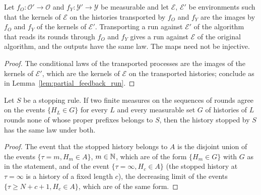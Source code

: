 \begin{lemma}
  \label{lem:relabel_run}
  \leanok
  Let $f_O : \mathcal{O}' \to \mathcal{O}$ and $f_Y : \mathcal{Y}' \to \mathcal{Y}$ be measurable and
  let $\mathcal{E}$, $\mathcal{E}'$ be environments such that the kernels of $\mathcal{E}$ on the
  histories transported by $f_O$ and $f_Y$ are the images by $f_O$ and $f_Y$ of the kernels of
  $\mathcal{E}'$. Transporting a run against $\mathcal{E}'$ of the algorithm that reads its rounds
  through $f_O$ and $f_Y$ gives a run against $\mathcal{E}$ of the original algorithm, and the
  outputs have the same law. The maps need not be injective.
\end{lemma}

\begin{proof}
  \leanok
  The conditional laws of the transported processes are the images of the kernels of
  $\mathcal{E}'$, which are the kernels of $\mathcal{E}$ on the transported histories; conclude as
  in Lemma~\ref{lem:partial_feedback_run}.
\end{proof}

\begin{lemma}
  \label{lem:stopped_law_pre_stop}
  \leanok
  Let $S$ be a stopping rule. If two finite measures on the sequences of rounds agree on the events
  $\{H_L \in G\}$ for every $L$ and every measurable set $G$ of histories of $L$ rounds none of whose
  proper prefixes belongs to $S$, then the history stopped by $S$ has the same law under both.
\end{lemma}

\begin{proof}
  \leanok
  The event that the stopped history belongs to $A$ is the disjoint union of the events
  $\{\tau = m, H_m \in A\}$, $m \in \mathbb{N}$, which are of the form $\{H_m \in G\}$ with $G$ as in the
  statement, and of the event $\{\tau = \infty, H_c \in A\}$ (the stopped history at $\tau = \infty$
  is a history of a fixed length $c$), the decreasing limit of the events
  $\{\tau \ge N + c + 1, H_c \in A\}$, which are of the same form.
\end{proof}


